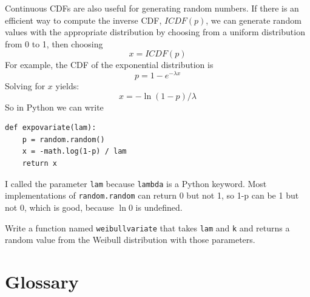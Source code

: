 \documentclass[12pt]{book}
\begin{document}
Continuous CDFs are also useful for generating random numbers.
If there is an efficient way to compute the inverse CDF, $ICDF(p)$,
we can generate random values with the appropriate distribution
by choosing from a uniform distribution from 0 to 1, then choosing
%
\[ x = ICDF(p) \]
%
For example, the CDF of the exponential distribution is
%
\[ p = 1 - e^{-\lambda x} \]
%
Solving for $x$ yields:
%
\[ x = -\ln (1-p) / \lambda \]
%
So in Python we can write

\begin{verbatim}
def expovariate(lam):
    p = random.random()
    x = -math.log(1-p) / lam
    return x
\end{verbatim}

I called the parameter \verb"lam" because \verb"lambda" is a Python
keyword.  Most implementations of {\tt random.random} can return 0 but
not 1, so 1-p can be 1 but not 0, which is good, because $\ln 0$ is
undefined.


\begin{exercise}
Write a function named \verb"weibullvariate" that takes
\verb"lam" and \verb"k" and returns a random value from the Weibull
distribution with those parameters.


\end{exercise}


\section{Glossary}
\end{document}
